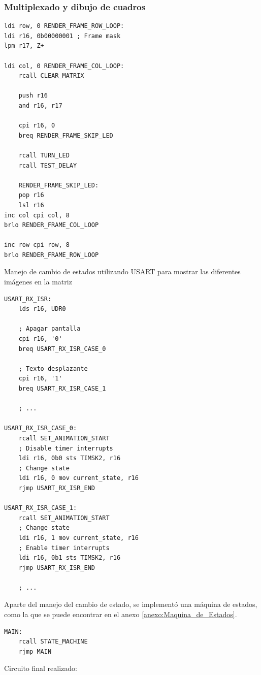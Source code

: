 \subsubsection{Multiplexado y dibujo de cuadros}
\begin{verbatim}
ldi row, 0 RENDER_FRAME_ROW_LOOP:  
ldi r16, 0b00000001 ; Frame mask
lpm r17, Z+

ldi col, 0 RENDER_FRAME_COL_LOOP:
    rcall CLEAR_MATRIX

    push r16
    and r16, r17

    cpi r16, 0 
    breq RENDER_FRAME_SKIP_LED

    rcall TURN_LED
    rcall TEST_DELAY

    RENDER_FRAME_SKIP_LED:
    pop r16
    lsl r16
inc col cpi col, 8 
brlo RENDER_FRAME_COL_LOOP 

inc row cpi row, 8 
brlo RENDER_FRAME_ROW_LOOP
\end{verbatim}

Manejo de cambio de estados utilizando USART para mostrar las diferentes imágenes en la matriz

\begin{verbatim}
USART_RX_ISR:	
    lds r16, UDR0

    ; Apagar pantalla
    cpi r16, '0' 
    breq USART_RX_ISR_CASE_0 

    ; Texto desplazante
    cpi r16, '1' 
    breq USART_RX_ISR_CASE_1 

    ; ...

USART_RX_ISR_CASE_0:
    rcall SET_ANIMATION_START
    ; Disable timer interrupts
    ldi r16, 0b0 sts TIMSK2, r16 
    ; Change state
    ldi r16, 0 mov current_state, r16   
    rjmp USART_RX_ISR_END

USART_RX_ISR_CASE_1:
    rcall SET_ANIMATION_START
    ; Change state
    ldi r16, 1 mov current_state, r16   
    ; Enable timer interrupts
    ldi r16, 0b1 sts TIMSK2, r16 
    rjmp USART_RX_ISR_END

    ; ...
\end{verbatim}

Aparte del manejo del cambio de estado, se implementó una máquina de estados, como la que se puede encontrar en el anexo \ref{anexo:Maquina_de_Estados}.

\begin{verbatim}
MAIN:
    rcall STATE_MACHINE
    rjmp MAIN
\end{verbatim}

Circuito final realizado:

